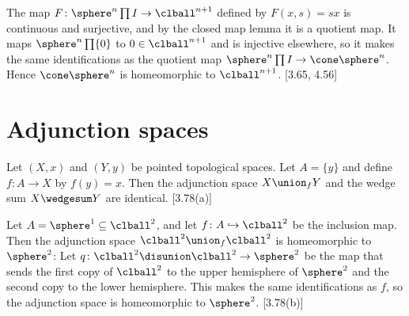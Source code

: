\documentclass[article, a4paper, 11pt, oneside]{memoir}
\numberwithin{equation}{chapter}
\begin{document}
\begin{example}
    The map $F \colon \sphere^n \prod I \to \clball^{n+1}$ defined by $F(x,s) = sx$ is continuous and surjective, and by the closed map lemma it is a quotient map. It maps $\sphere^n \prod \{0\}$ to $0 \in \clball^{n+1}$ and is injective elsewhere, so it makes the same identifications as the quotient map $\sphere^n \prod I \to \cone\sphere^n$. Hence $\cone\sphere^n$ is homeomorphic to $\clball^{n+1}$. [3.65, 4.56]
\end{example}


\chapter{Adjunction spaces}

\begin{example}
    Let $(X,x)$ and $(Y,y)$ be pointed topological spaces. Let $A = \{y\}$ and define $f \colon A \to X$ by $f(y) = x$. Then the adjunction space $X \union_f Y$ and the wedge sum $X \wedgesum Y$ are identical. [3.78(a)]
\end{example}

\begin{example}
    Let $A = \sphere^1 \subseteq \clball^2$, and let $f \colon A \hookrightarrow \clball^2$ be the inclusion map. Then the adjunction space $\clball^2 \union_f \clball^2$ is homeomorphic to $\sphere^2$: Let $q \colon \clball^2 \disunion \clball^2 \to \sphere^2$ be the map that sends the first copy of $\clball^2$ to the upper hemisphere of $\sphere^2$ and the second copy to the lower hemisphere. This makes the same identifications as $f$, so the adjunction space is homeomorphic to $\sphere^2$. [3.78(b)]
\end{example}
\end{document}
